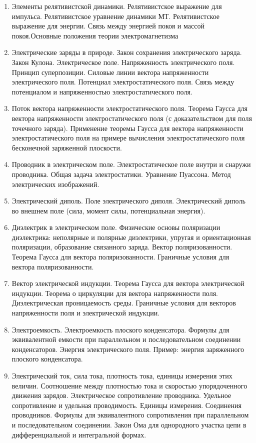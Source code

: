 \documentclass[12pt]{article}
\begin{document}
\begin{enumerate}
        \item Элементы релятивистской динамики. Релятивистское выражение для импульса. Релятивистское уравнение динамики МТ. Релятивистское выражение для энергии. Связь между энергией покоя и массой покоя.Основные положения теории электромагнетизма
        \item Электрические заряды в природе. Закон сохранения электрического заряда. Закон Кулона. Электрическое поле. Напряженность электрического поля. Принцип суперпозиции. Силовые линии вектора напряженности электрического поля. Потенциал электростатического поля. Связь между потенциалом и напряженностью электростатического поля.
        \item Поток вектора напряженности электростатического поля. Теорема Гаусса для вектора напряженности электростатического поля (с доказательством для поля точечного заряда). Применение теоремы Гаусса для вектора напряженности электростатического поля на примере вычисления электростатического поля бесконечной заряженной плоскости.
        \item Проводник в электрическом поле. Электростатическое поле внутри и снаружи проводника. Общая задача электростатики. Уравнение Пуассона. Метод электрических изображений.
        \item Электрический диполь. Поле электрического диполя. Электрический диполь во внешнем поле (сила, момент силы, потенциальная энергия).
        \item Диэлектрик в электрическом поле. Физические основы поляризации диэлектрика: неполярные и полярные диэлектрики, упругая и ориентационная поляризации, образование связанного заряда. Вектор поляризованности. Теорема Гаусса для вектора поляризованности. Граничные условия для вектора поляризованности.
        \item Вектор электрической индукции. Теорема Гаусса для вектора электрической индукции. Теорема о циркуляции для вектора напряженности поля. Диэлектрическая проницаемость среды. Граничные условия для векторов напряженности поля и электрической индукции.
        \item Электроемкость. Электроемкость плоского конденсатора. Формулы для эквивалентной емкости при параллельном и последовательном соединении конденсаторов. Энергия электрического поля. Пример: энергия заряженного плоского конденсатора.
        \item Электрический ток, сила тока, плотность тока, единицы измерения этих величин. Соотношение между плотностью тока и скоростью упорядоченного движения зарядов. Электрическое сопротивление проводника. Удельное сопротивление и удельная проводимость. Единицы измерения. Соединения проводников. Формулы для эквивалентного сопротивления при параллельном и последовательном соединении. Закон Ома для однородного участка цепи в дифференциальной и интегральной формах.

\end{enumerate}
\end{document}
